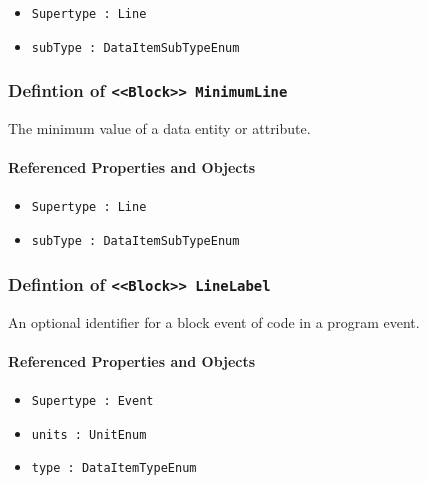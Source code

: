 \begin{itemize}
\item \texttt{Supertype : Line}

\item \texttt{subType : DataItemSubTypeEnum}

\end{itemize}
\FloatBarrier
\subsubsection{Defintion of \texttt{<<Block>> MinimumLine}}
  \label{type:MinimumLine}

\FloatBarrier

The minimum value of a data entity or attribute.

\FloatBarrier
\paragraph{Referenced Properties and Objects}

\begin{itemize}
\item \texttt{Supertype : Line}

\item \texttt{subType : DataItemSubTypeEnum}

\end{itemize}
\FloatBarrier
\subsubsection{Defintion of \texttt{<<Block>> LineLabel}}
  \label{type:LineLabel}

\FloatBarrier

An optional identifier for a block event of code in a program event.

\FloatBarrier
\paragraph{Referenced Properties and Objects}

\begin{itemize}
\item \texttt{Supertype : Event}

\item \texttt{units : UnitEnum}

\item \texttt{type : DataItemTypeEnum}

\end{itemize}
\FloatBarrier
